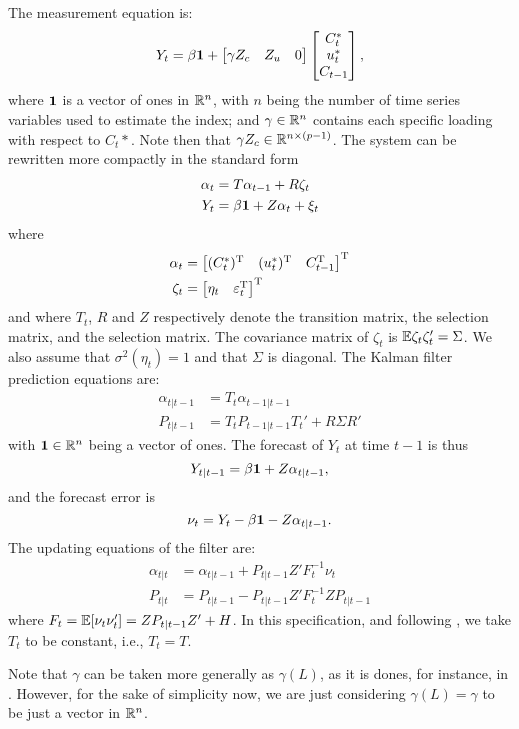 The measurement equation is:
\begin{equation}
	Y_t = \beta \mathbf{1} + \begin{bmatrix}
		\gamma Z_c & Z_u & 0 
	\end{bmatrix}
	\begin{bmatrix}
		C_t^\ast\\u_t^\ast \\ C_{t-1}
	\end{bmatrix},
\end{equation}
where $\mathbf{1}$ is a vector of ones in $\mathbb{R}^n$, with $n$ being the number of time series variables used to estimate the index; and $\gamma\in \mathbb{R}^n$ contains each specific loading with respect to $C_t\ast$. Note then that $\gamma Z_c\in \mathbb{R}^{n\times (p-1)}$. The system can be rewritten more compactly in the standard form
\begin{align}
	\alpha_t & = T \alpha_{t-1} + R\zeta_t \label{eq:alpha}\\
	Y_t & = \beta \mathbf{1} + Z\alpha_t + \xi_t\label{eq:Y}
\end{align}
where
\begin{equation}
	\begin{aligned}
		\alpha_t &= \begin{bmatrix}
			(C_t^\ast)^{\scriptsize \rm T} & (u_t^\ast)^{\scriptsize \rm T} & C_{t-1}^{\scriptsize \rm T}\\
		\end{bmatrix}^{\scriptsize \rm T}\\
		\zeta_t & = \begin{bmatrix}
			\eta_t & \varepsilon_t^{\scriptsize \rm T}
		\end{bmatrix}^{\scriptsize \rm T}
	\end{aligned}
\end{equation}
and where $T_t$, $R$ and $Z$ respectively denote the transition matrix, the selection matrix, and the selection matrix. The covariance matrix of $\zeta_t$ is $\mathbb{E}\zeta_t\zeta_t'=\Sigma$. We also assume that $\sigma^2(\eta_t) = 1$ and that $\Sigma$ is diagonal. The Kalman filter prediction equations are: 
\begin{align}
	\alpha_{t|t-1} &= T_t \alpha_{t-1|t-1}\\
	P_{t|t-1} &= T_t P_{t-1|t-1}T_t' + R\Sigma R'
\end{align}
with $\mathbf{1}\in\mathbb{R}^n$ being a vector of ones. The forecast of $Y_t$ at time $t-1$ is thus $$Y_{t|t-1} = \beta\mathbf{1} + Z\alpha_{t|t-1},$$ and the forecast error is $$\nu_t=Y_t-\beta\mathbf{1} - Z\alpha_{t|t-1}.$$ The updating equations of the filter are:
\begin{align}
	\alpha_{t|t} &= \alpha_{t|t-1} + P_{t|t-1} Z'F_t^{-1}\nu_t\\
	P_{t|t}& = P_{t|t-1} - P_{t|t-1}Z'F_t^{-1} Z P_{t|t-1}
\end{align}
where $F_t = \mathbb{E}[\nu_t\nu_t'] = Z P_{t|t-1}Z' + H$. In this specification, and following , we take $T_t$ to be constant, i.e., $T_t = T$.%


Note that $\gamma$ can be taken more generally as $\gamma(L)$, as it is dones, for instance, in . However, for the sake of simplicity now, we are just considering $\gamma(L) = \gamma$ to be just a vector in $\mathbb{R}^n$.